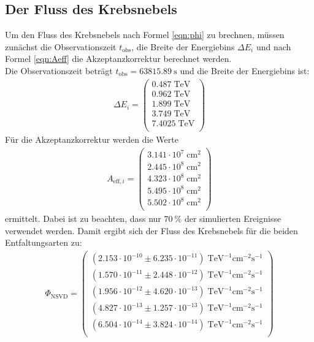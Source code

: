 \subsection{Der Fluss des Krebsnebels}
Um den Fluss des Krebsnebels nach Formel \eqref{eqn:phi} zu brechnen, müssen zunächst die Observationszeit $t_{\text{obs}}$, die Breite der Energiebins $\Delta E_{i}$ und nach Formel \eqref{eqn:Aeff} die Akzeptanzkorrektur berechnet werden.\\
Die Observationszeit beträgt $t_{\text{obs}} = \SI{63815.89}{\second}$ und die Breite der Energiebins ist:
\begin{align*}
	\Delta E_{i} = \begin{pmatrix}
			0.487\;\mathrm{TeV}\\
			0.962\;\mathrm{TeV}\\
			1.899\;\mathrm{TeV}\\
			3.749\;\mathrm{TeV}\\
			7.4025\;\mathrm{TeV}\\
	\end{pmatrix}
\end{align*}
Für die Akzeptanzkorrektur werden die Werte
\begin{align*}
	A_{\text{eff},i} = \begin{pmatrix}
			3.141\cdot10^{7}\;\mathrm{cm}^2\\
			2.445\cdot10^{8}\;\mathrm{cm}^2\\
			4.323\cdot10^{8}\;\mathrm{cm}^2\\
			5.495\cdot10^{8}\;\mathrm{cm}^2\\
			5.502\cdot10^{8}\;\mathrm{cm}^2\\
	\end{pmatrix}
\end{align*}
ermittelt. Dabei ist zu beachten, dass nur $\SI{70}{\percent}$ der simulierten Ereignisse verwendet werden.
Damit ergibt sich der Fluss des Krebsnebels für die beiden Entfaltungsarten zu:
\begin{align*}
	\Phi_{\text{NSVD}} = \begin{pmatrix}
			(2.153\cdot10^{-10}\pm 6.235\cdot10^{-11})\;\mathrm{TeV}^{-1}\mathrm{cm}^{-2}\mathrm{s}^{-1}\\
			(1.570\cdot10^{-11}\pm 2.448\cdot10^{-12})\;\mathrm{TeV}^{-1}\mathrm{cm}^{-2}\mathrm{s}^{-1}\\
			(1.956\cdot10^{-12}\pm 4.620\cdot10^{-13})\;\mathrm{TeV}^{-1}\mathrm{cm}^{-2}\mathrm{s}^{-1}\\
			(4.827\cdot10^{-13}\pm 1.257\cdot10^{-13})\;\mathrm{TeV}^{-1}\mathrm{cm}^{-2}\mathrm{s}^{-1}\\
			(6.504\cdot10^{-14}\pm 3.824\cdot10^{-14})\;\mathrm{TeV}^{-1}\mathrm{cm}^{-2}\mathrm{s}^{-1}\\
	 \end{pmatrix}
\end{align*}
